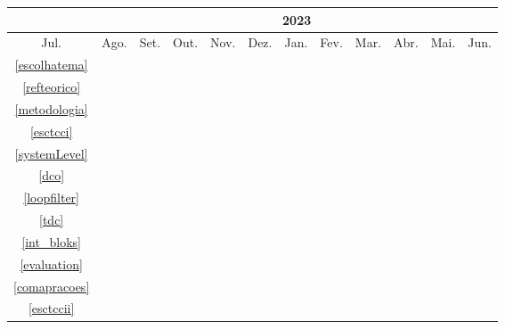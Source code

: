 \begin{table}[!htbp]
	\centering
		\begin{tabular}{|c|c|c|c|c|c|c|c|c|c|c|c|}
		\hline
		&\multicolumn{11}{c|}{2023}\\
		\hline
		Jul.&Ago.&Set.&Out.&Nov. &Dez. &Jan. &Fev.&Mar.&Abr.&Mai.&Jun.\\
		\hline
		\ref{escolhatema}&\cellcolor{midgray}&&&&&&&&&&\\
		\hline
		\ref{refteorico}&&\cellcolor{midgray}&\cellcolor{midgray}&&&&&&&&\\
		\hline
		\ref{metodologia}&&&\cellcolor{midgray}&\cellcolor{midgray}&&&&&&&\\
		\hline
		\ref{esctcci}&&&&\cellcolor{midgray}&\cellcolor{midgray}&&&&&&\\
		\hline
		\ref{systemLevel}&&&&&&\cellcolor{midgray}&&&&&\\
		\hline
		\ref{dco}&&&&&&&\cellcolor{midgray}&&&&\\
		\hline	
		\ref{loopfilter}&&&&&&&&\cellcolor{midgray}&&&\\
		\hline
		\ref{tdc}&&&&&&&&&\cellcolor{midgray}&&\\
		\hline
		\ref{int_bloks}&&&&&&&&&\cellcolor{midgray}&\cellcolor{midgray}&\\
		\hline
		\ref{evaluation}&&&&&&&&&&\cellcolor{midgray}&\\
		\hline	
		\ref{comapracoes}&&&&&&&&&&\cellcolor{midgray}&\\
		\hline
		\ref{esctccii}&&&&&&&&&\cellcolor{midgray}&\cellcolor{midgray}&\cellcolor{midgray}\\
		\hline	
		\end{tabular}
\end{table}